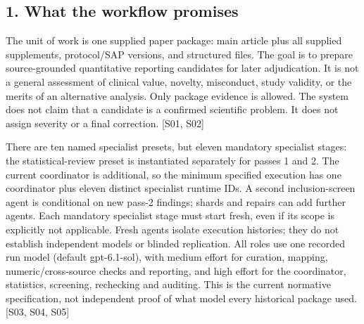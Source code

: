 \documentclass[10pt,a4paper]{article}
\begin{document}
\subsection*{1.\allowbreak{} What the workflow promises}
The unit of work is one supplied paper package: main article plus all supplied supplements, protocol/\allowbreak{}SAP versions, and structured files.\allowbreak{} The goal is to prepare source-\allowbreak{}grounded quantitative reporting candidates for later adjudication.\allowbreak{} It is not a general assessment of clinical value, novelty, misconduct, study validity, or the merits of an alternative analysis.\allowbreak{} Only package evidence is allowed.\allowbreak{} The system does not claim that a candidate is a confirmed scientific problem.\allowbreak{} It does not assign severity or a final correction.\allowbreak{} [S01, S02]\par
There are ten named specialist presets, but eleven mandatory specialist stages: the statistical-\allowbreak{}review preset is instantiated separately for passes 1 and 2.\allowbreak{} The current coordinator is additional, so the minimum specified execution has one coordinator plus eleven distinct specialist runtime IDs.\allowbreak{} A second inclusion-\allowbreak{}screen agent is conditional on new pass-\allowbreak{}2 findings; shards and repairs can add further agents.\allowbreak{} Each mandatory specialist stage must start fresh, even if its scope is explicitly not applicable.\allowbreak{} Fresh agents isolate execution histories; they do not establish independent models or blinded replication.\allowbreak{} All roles use one recorded run model (default gpt-\allowbreak{}6.\allowbreak{}1-\allowbreak{}sol), with medium effort for curation, mapping, numeric/\allowbreak{}cross-\allowbreak{}source checks and reporting, and high effort for the coordinator, statistics, screening, rechecking and auditing.\allowbreak{} This is the current normative specification, not independent proof of what model every historical package used.\allowbreak{} [S03, S04, S05]\par
\end{document}

